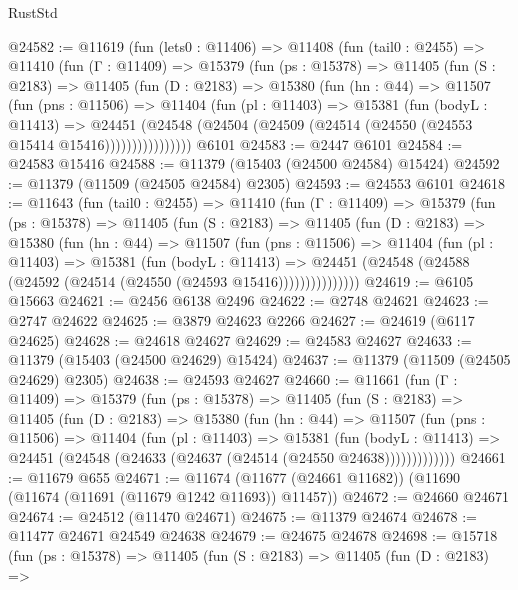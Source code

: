 \begin{lexlean}{RustStd}
\begin{coremodule}
@24582 := @11619
    (fun (lets0 : @11406) =>
    @11408
      (fun (tail0 : @2455) =>
      @11410
        (fun (Γ : @11409) =>
        @15379
          (fun (ps : @15378) =>
          @11405
            (fun (S : @2183) =>
            @11405
              (fun (D : @2183) =>
              @15380
                (fun (hn : @44) =>
                @11507
                  (fun (pns : @11506) =>
                  @11404
                    (fun (pl : @11403) =>
                    @15381
                      (fun (bodyL : @11413) =>
                      @24451
                        (@24548
                          (@24504 (@24509 (@24514 (@24550 (@24553 @15414 @15416))))))))))))))))
    @6101
@24583 := @2447 @6101
@24584 := @24583 @15416
@24588 := @11379 (@15403 (@24500 @24584) @15424)
@24592 := @11379 (@11509 (@24505 @24584) @2305)
@24593 := @24553 @6101
@24618 := @11643
    (fun (tail0 : @2455) =>
    @11410
      (fun (Γ : @11409) =>
      @15379
        (fun (ps : @15378) =>
        @11405
          (fun (S : @2183) =>
          @11405
            (fun (D : @2183) =>
            @15380
              (fun (hn : @44) =>
              @11507
                (fun (pns : @11506) =>
                @11404
                  (fun (pl : @11403) =>
                  @15381
                    (fun (bodyL : @11413) =>
                    @24451 (@24548 (@24588 (@24592 (@24514 (@24550 (@24593 @15416)))))))))))))))
@24619 := @6105 @15663
@24621 := @2456 @6138 @2496
@24622 := @2748 @24621
@24623 := @2747 @24622
@24625 := @3879 @24623 @2266
@24627 := @24619 (@6117 @24625)
@24628 := @24618 @24627
@24629 := @24583 @24627
@24633 := @11379 (@15403 (@24500 @24629) @15424)
@24637 := @11379 (@11509 (@24505 @24629) @2305)
@24638 := @24593 @24627
@24660 := @11661
    (fun (Γ : @11409) =>
    @15379
      (fun (ps : @15378) =>
      @11405
        (fun (S : @2183) =>
        @11405
          (fun (D : @2183) =>
          @15380
            (fun (hn : @44) =>
            @11507
              (fun (pns : @11506) =>
              @11404
                (fun (pl : @11403) =>
                @15381
                  (fun (bodyL : @11413) =>
                  @24451 (@24548 (@24633 (@24637 (@24514 (@24550 @24638)))))))))))))
@24661 := @11679 @655
@24671 := @11674 (@11677 (@24661 @11682)) (@11690 (@11674 (@11691 (@11679 @1242 @11693)) @11457))
@24672 := @24660 @24671
@24674 := @24512 (@11470 @24671)
@24675 := @11379 @24674
@24678 := @11477 @24671 @24549 @24638
@24679 := @24675 @24678
@24698 := @15718
    (fun (ps : @15378) =>
    @11405
      (fun (S : @2183) =>
      @11405
        (fun (D : @2183) =>

\end{coremodule}
\end{lexlean}
